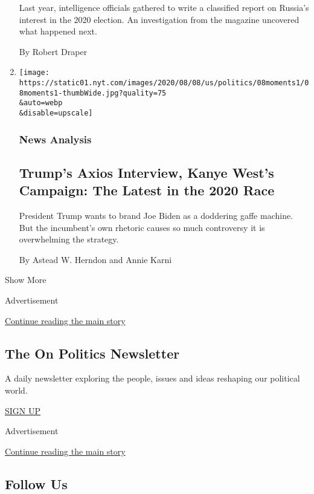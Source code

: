 \begin{enumerate}
  Last year, intelligence officials gathered to write a classified
  report on Russia's interest in the 2020 election. An investigation
  from the magazine uncovered what happened next.

  By Robert Draper
\item
  \href{/2020/08/08/us/politics/trump-biden-polls-interview.html}{}

  \texttt{[image: https://static01.nyt.com/images/2020/08/08/us/politics/08moments1/08moments1-thumbWide.jpg?quality=75\\\&auto=webp\\\&disable=upscale]}

  \hypertarget{news-analysis-2}{%
  \subsubsection{News Analysis}\label{news-analysis-2}}

  \hypertarget{trumps-axios-interview-kanye-wests-campaign-the-latest-in-the-2020-race}{%
  \subsection{Trump's Axios Interview, Kanye West's Campaign: The Latest
  in the 2020
  Race}\label{trumps-axios-interview-kanye-wests-campaign-the-latest-in-the-2020-race}}

  President Trump wants to brand Joe Biden as a doddering gaffe machine.
  But the incumbent's own rhetoric causes so much controversy it is
  overwhelming the strategy.

  By Astead W. Herndon and Annie Karni
\end{enumerate}

Show More

Advertisement

\protect\hyperlink{after-mid2}{Continue reading the main story}

\hypertarget{the-on-politics-newsletter}{%
\subsection{The On Politics
Newsletter}\label{the-on-politics-newsletter}}

A daily newsletter exploring the people, issues and ideas reshaping our
political world.

\href{/newsletters/signup/CN}{SIGN UP}

Advertisement

\protect\hyperlink{after-mktg}{Continue reading the main story}

\hypertarget{follow-us}{%
\subsection{Follow Us}\label{follow-us}}

